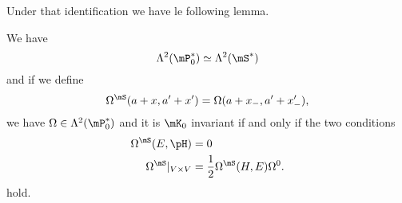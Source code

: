 Under that identification we have le following lemma.
\begin{lemma}
	We have
	\begin{equation}
		\Lambda^2(\mP_0^*)\simeq\Lambda^2(\mS^*)
	\end{equation}
	and if we define
	\begin{equation}
		\Omega^{\mS}(a+x,a'+x')=\Omega(a+x_-,a'+x'_-),
	\end{equation}
	we have $\Omega\in\Lambda^2(\mP_0^*)$ and it is $\mK_0$ invariant if and only if the two conditions
	\begin{equation}
		\begin{aligned}[]
			\Omega^{\mS}(E,\pH)       & =0                                       \\
			\Omega^{\mS}|_{V\times V} & =\frac{ 1 }{2}\Omega^{\mS}(H,E)\Omega^0.
		\end{aligned}
	\end{equation}
	hold.
\end{lemma}

